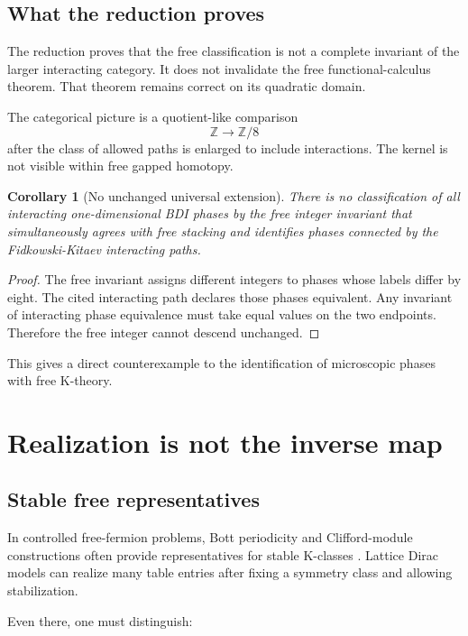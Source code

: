 \documentclass[12pt]{article}
\newtheorem{corollary}[theorem]{Corollary}
\theoremstyle{definition}
\theoremstyle{remark}
\newcommand{\Z}{\mathbb Z}
\begin{document}
\subsection{What the reduction proves}

The reduction proves that the free classification is not a complete invariant
of the larger interacting category.
It does not invalidate the free functional-calculus theorem.
That theorem remains correct on its quadratic domain.

The categorical picture is a quotient-like comparison
\[
\Z
\longrightarrow
\Z/8
\]
after the class of allowed paths is enlarged to include interactions.
The kernel is not visible within free gapped homotopy.

\begin{corollary}[No unchanged universal extension]
There is no classification of all interacting one-dimensional BDI phases by
the free integer invariant that simultaneously agrees with free stacking and
identifies phases connected by the Fidkowski-Kitaev interacting paths.
\end{corollary}

\begin{proof}
The free invariant assigns different integers to phases whose labels differ by
eight.
The cited interacting path declares those phases equivalent.
Any invariant of interacting phase equivalence must take equal values on the
two endpoints.
Therefore the free integer cannot descend unchanged.
\end{proof}

This gives a direct counterexample to the identification of
microscopic phases with free K-theory.

\section{Realization is not the inverse map}

\subsection{Stable free representatives}

In controlled free-fermion problems, Bott periodicity and Clifford-module
constructions often provide representatives for stable K-classes
\cite{Kitaev2009,Thiang2016}.
Lattice Dirac models can realize many table entries after fixing a symmetry
class and allowing stabilization.

Even there, one must distinguish:
\end{document}
